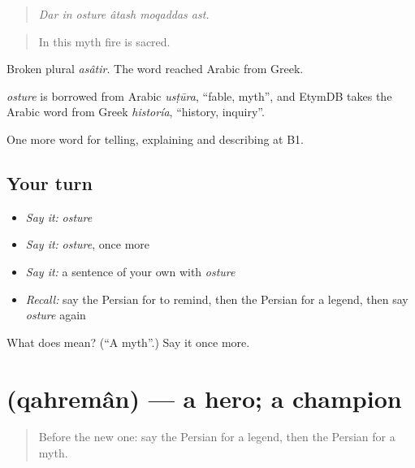 \begin{quote}
\emph{Dar in osture âtash moqaddas ast.}
\end{quote}

\begin{quote}
In this myth fire is sacred.
\end{quote}

Broken plural \emph{asâtir}. The word reached Arabic from Greek.

\begin{cousinweb}
\emph{osture} is borrowed from Arabic \emph{usṭūra}, \textquotedblleft{}fable, myth\textquotedblright{}, and EtymDB takes the Arabic word from Greek \emph{historía}, \textquotedblleft{}history, inquiry\textquotedblright{}.
\end{cousinweb}

\begin{grammarlens}[title={What you've built}]
One more word for telling, explaining and describing at B1.
\end{grammarlens}

\subsection*{Your turn}
\begin{itemize}
\raggedright
  \item \emph{Say it:} \emph{osture}
  \item \emph{Say it:} \emph{osture}, once more
  \item \emph{Say it:} a sentence of your own with \emph{osture}
  \item \emph{Recall:} say the Persian for to remind, then the Persian for a legend, then say \emph{osture} again
\end{itemize}

\begin{tcolorbox}[breakable,colback=teal!4,colframe=teal!35!black,title={Before you move on}]
What does  mean? (\textquotedblleft{}A myth\textquotedblright{}.) Say it once more.
\end{tcolorbox}
\section[\texorpdfstring{\fa{قهرمان} (qahremân)}{قهرمان (qahremân)}]{ (qahremân) — a hero; a champion}

\label{lesson:FA-C347-qahreman}



\begin{quote}
Before the new one: say the Persian for a legend, then the Persian for a myth.
\end{quote}

